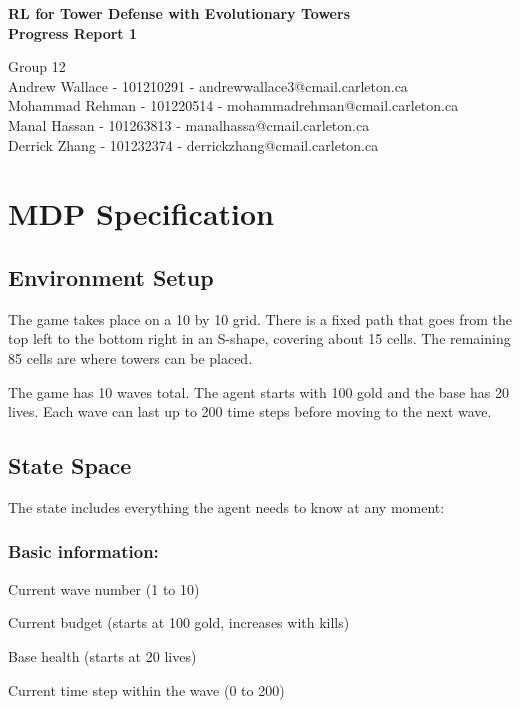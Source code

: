 \documentclass[12pt]{article}
\begin{document}
\begin{center} \Large\bf
RL for Tower Defense with Evolutionary Towers\\
Progress Report 1
\end{center} 
\begin{center}
Group 12 \\
Andrew Wallace - 101210291 - andrewwallace3@cmail.carleton.ca\\
Mohammad Rehman - 101220514 - mohammadrehman@cmail.carleton.ca \\
Manal Hassan - 101263813 - manalhassa@cmail.carleton.ca\\
Derrick Zhang - 101232374 - derrickzhang@cmail.carleton.ca
\end{center}

\section*{MDP Specification}

\subsection*{Environment Setup}

The game takes place on a 10 by 10 grid. There is a fixed path that goes from the top left to the bottom right in an S-shape, covering about 15 cells. The remaining 85 cells are where towers can be placed.

The game has 10 waves total. The agent starts with 100 gold and the base has 20 lives. Each wave can last up to 200 time steps before moving to the next wave.

\subsection*{State Space}

The state includes everything the agent needs to know at any moment:

\subsubsection*{Basic information:}
\begin{compactitem}
\item Current wave number (1 to 10)
\item Current budget (starts at 100 gold, increases with kills)
\item Base health (starts at 20 lives)
\item Current time step within the wave (0 to 200)
\end{compactitem}
\end{document}
